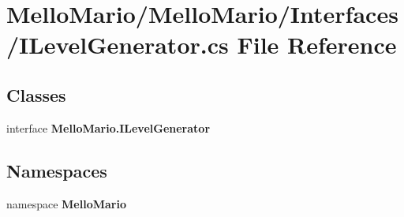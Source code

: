 \section{Mello\+Mario/\+Mello\+Mario/\+Interfaces/\+I\+Level\+Generator.cs File Reference}
\label{ILevelGenerator_8cs}
\subsection*{Classes}
\begin{DoxyCompactItemize}
\item 
interface \textbf{ Mello\+Mario.\+I\+Level\+Generator}
\end{DoxyCompactItemize}
\subsection*{Namespaces}
\begin{DoxyCompactItemize}
\item 
namespace \textbf{ Mello\+Mario}
\end{DoxyCompactItemize}
